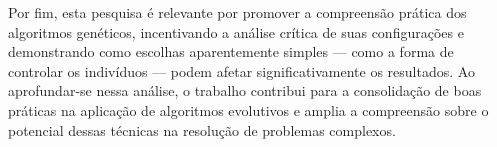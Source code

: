 Por fim, esta pesquisa é relevante por promover a compreensão prática dos algoritmos genéticos, incentivando a análise crítica de suas configurações e demonstrando como escolhas aparentemente simples — como a forma de controlar os indivíduos — podem afetar significativamente os resultados. Ao aprofundar-se nessa análise, o trabalho contribui para a consolidação de boas práticas na aplicação de algoritmos evolutivos e amplia a compreensão sobre o potencial dessas técnicas na resolução de problemas complexos.

